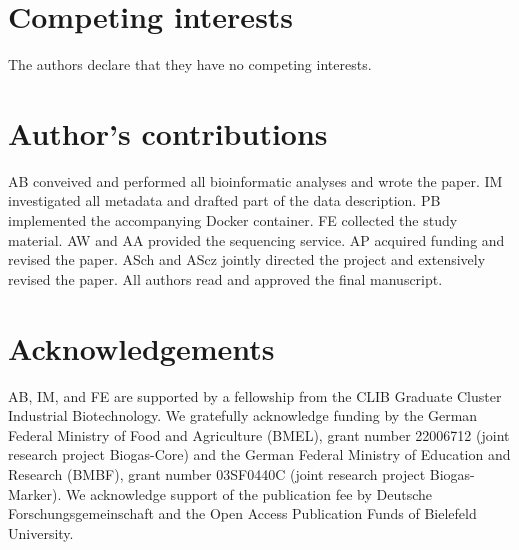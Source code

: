 \documentclass{bmcart}
\begin{document}
\begin{backmatter}

\section*{Competing interests}
The authors declare that they have no competing interests.

\section*{Author's contributions}
AB conveived and performed all bioinformatic analyses and wrote the paper.
IM investigated all metadata and drafted part of the data description.
PB implemented the accompanying Docker container.
FE collected the study material.
AW and AA provided the sequencing service.
AP acquired funding and revised the paper.
ASch and AScz jointly directed the project and extensively revised the paper.
All authors read and approved the final manuscript.

\section*{Acknowledgements}
AB, IM, and FE are supported by a fellowship from the CLIB Graduate Cluster Industrial Biotechnology.
We gratefully acknowledge funding by the German Federal Ministry of Food and Agriculture (BMEL), grant number 22006712 (joint research project Biogas-Core) and the German Federal Ministry of Education and Research (BMBF), grant number 03SF0440C (joint research project Biogas-Marker).
We acknowledge support of the publication fee by Deutsche Forschungsgemeinschaft and the Open Access Publication Funds of Bielefeld University.



\end{backmatter}
\end{document}
